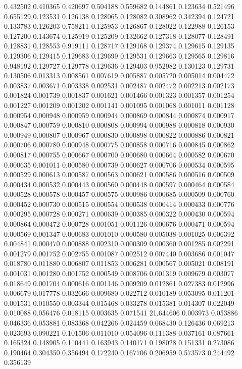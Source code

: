 0.432502
0.410365
0.420697
0.504188
0.559682
0.144861
0.123634
0.521496
0.655129
0.123531
0.126138
0.128065
0.128082
0.308962
0.342394
0.124721
0.133783
0.126203
0.758211
0.125953
0.126867
0.128022
0.122988
0.126153
0.127200
0.143674
0.125919
0.125209
0.132662
0.127318
0.128077
0.128491
0.128831
0.128553
0.919111
0.128717
0.129168
0.129374
0.129615
0.129135
0.129306
0.129415
0.129683
0.129699
0.129531
0.129663
0.129565
0.129816
0.948192
0.129727
0.129778
0.129636
0.129403
0.952982
0.130123
0.129731
0.130506
0.013313
0.008561
0.007619
0.005887
0.005720
0.005014
0.004472
0.003837
0.003671
0.003338
0.002531
0.002487
0.002472
0.002213
0.002173
0.001824
0.001739
0.001837
0.001621
0.001466
0.001323
0.001357
0.001254
0.001227
0.001209
0.001202
0.001141
0.001095
0.001068
0.001011
0.001128
0.000954
0.000948
0.000959
0.000944
0.000869
0.000844
0.000874
0.000917
0.000847
0.000759
0.000810
0.000808
0.000994
0.000988
0.000818
0.000930
0.000949
0.000807
0.000967
0.000830
0.000898
0.000822
0.000886
0.000821
0.000706
0.000780
0.000948
0.000775
0.000858
0.000716
0.000845
0.000862
0.000817
0.000755
0.000667
0.000700
0.000680
0.000664
0.000582
0.000670
0.000635
0.001011
0.000580
0.000739
0.000627
0.000706
0.000534
0.000595
0.000529
0.000613
0.000587
0.000563
0.000621
0.000586
0.000516
0.000509
0.000434
0.000532
0.000443
0.000560
0.000448
0.000597
0.000464
0.000584
0.000528
0.000578
0.000457
0.000575
0.000986
0.000685
0.000509
0.000760
0.000452
0.000730
0.000515
0.000554
0.000538
0.000414
0.000433
0.000776
0.000295
0.000728
0.000271
0.000639
0.000385
0.000322
0.000430
0.000594
0.000864
0.000472
0.000728
0.001051
0.001126
0.000676
0.000471
0.000594
0.000569
0.001347
0.000683
0.001010
0.000580
0.005038
0.001025
0.006392
0.004841
0.000470
0.000888
0.002310
0.000309
0.000360
0.001285
0.002291
0.001279
0.001752
0.002755
0.001087
0.002512
0.007440
0.003686
0.001047
0.018780
0.011880
0.006807
0.011853
0.006281
0.000567
0.005021
0.008191
0.001031
0.001280
0.001752
0.000549
0.008706
0.001319
0.009679
0.003077
0.018649
0.001704
0.000616
0.001146
0.009209
0.012861
0.027383
0.012996
0.006679
0.017778
0.032666
0.009680
0.022712
0.010189
0.053095
0.011201
0.001531
0.010550
0.003344
0.015468
0.033278
0.015381
0.014307
0.022049
0.010088
0.056476
0.018115
0.003635
0.071541
21.644606
0.003973
0.053886
0.046336
0.053881
0.083368
0.042266
0.024459
0.068430
0.126436
0.069213
0.023693
0.090221
0.101506
0.011010
0.054096
0.111388
0.037161
0.087661
0.165324
0.148905
0.110441
0.163943
0.140171
0.198028
0.151331
0.273086
0.190464
0.304350
0.356494
0.172240
0.167706
0.206959
0.573573
0.244492
0.356139
